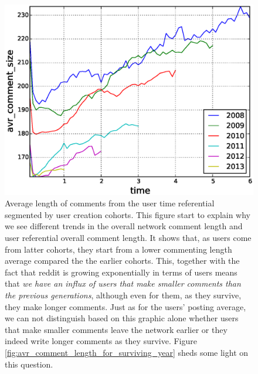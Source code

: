 \begin{figure}[!tb]
\centering
\includegraphics[scale=0.4]{./images/avr_comment_size_cohorts.eps}
\caption{Average length of comments from the user time referential segmented by user creation cohorts. This figure start to explain why we see different trends in the overall network comment length and user referential overall comment length. It shows that, as users come from latter cohorts, they start from a lower commenting length average compared the the earlier cohorts. This, together with the fact that reddit is growing exponentially in terms of users means that \textit{we have an influx of users that make smaller comments than the previous generations}, although even for them, as they survive, they make longer comments. Just as for the users' posting average, we can not distinguish based on this graphic alone whether users that make smaller comments leave the network earlier or they indeed write longer comments as they survive. Figure \ref{fig:avr_comment_length_for_surviving_year} sheds some light on this question.}
\label{fig:fig_label}
\end{figure}

